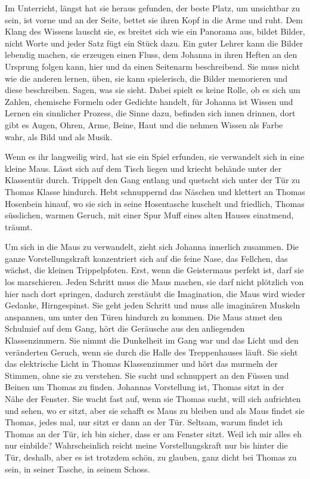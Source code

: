 \documentclass[10pt,titlepage,a5paper]{book}
\begin{document}
Im Unterricht, längst hat sie heraus gefunden, der beste Platz, um unsichtbar zu sein, ist vorne und an der Seite, bettet sie ihren Kopf in die Arme und ruht. Dem Klang des Wissens lauscht sie, es breitet sich wie ein Panorama aus, bildet Bilder, nicht Worte und jeder Satz fügt ein Stück dazu. Ein guter Lehrer kann die Bilder lebendig machen, sie erzeugen einen Fluss, dem Johanna in ihren Heften an den Ursprung folgen kann, hier und da einen Seitenarm beschreibend. Sie muss nicht wie die anderen lernen, üben, sie kann spielerisch, die Bilder memorieren und diese beschreiben. Sagen, was sie sieht. Dabei spielt es keine Rolle, ob es sich um Zahlen, chemische Formeln oder Gedichte handelt, für Johanna ist Wissen und Lernen ein sinnlicher Prozess, die Sinne dazu, befinden sich innen drinnen, dort gibt es Augen, Ohren, Arme, Beine, Haut und die nehmen Wissen als Farbe wahr, als Bild  und als Musik.

Wenn es ihr langweilig wird, hat sie ein Spiel erfunden, sie verwandelt sich in eine kleine Maus. Lässt sich auf dem Tisch liegen und kriecht behände unter der Klassentür durch. Trippelt den Gang entlang und quetscht sich unter der Tür zu Thomas Klasse hindurch. Hebt schnuppernd das Näschen und klettert an Thomas Hosenbein hinauf, wo sie sich in seine Hosentasche kuschelt und friedlich, Thomas süsslichen, warmen Geruch, mit einer Spur Muff eines alten Hauses einatmend, träumt. 

Um sich in die Maus zu verwandelt, zieht sich Johanna innerlich zusammen. Die ganze Vorstellungskraft konzentriert sich auf die feine Nase, das Fellchen, das wächst, die kleinen Trippelpfoten. Erst, wenn die Geistermaus perfekt ist, darf sie los marschieren. Jeden Schritt muss die Maus machen, sie darf nicht plötzlich von hier nach dort springen, dadurch zerstäubt die Imagination, die Maus wird wieder Gedanke, Hirngespinst. Sie geht jeden Schritt und muss alle imaginären Muskeln anspannen, um unter den Türen hindurch zu kommen. Die Maus atmet den Schulmief auf dem Gang, hört die Geräusche aus den anliegenden Klassenzimmern. Sie nimmt die Dunkelheit im Gang war und das Licht und den veränderten Geruch, wenn sie durch die Halle des Treppenhauses läuft. Sie sieht das elektrische Licht in Thomas Klassenzimmer und hört das murmeln der Stimmen, ohne sie zu verstehen. Sie sucht und schnuppert an den Füssen und Beinen um Thomas zu finden. Johannas Vorstellung ist, Thomas sitzt in der Nähe der Fenster. Sie wacht fast auf, wenn sie Thomas sucht, will sich aufrichten und sehen, wo er sitzt, aber sie schafft es Maus zu bleiben und als Maus findet sie Thomas, jedes mal, nur sitzt er dann an der Tür. Seltsam, warum findet ich Thomas an der Tür, ich bin sicher, dass er am Fenster sitzt. Weil ich mir alles eh nur einbilde? Wahrscheinlich reicht meine Vorstellungskraft nur bis hinter die Tür, deshalb, aber es ist trotzdem schön, zu glauben, ganz dicht bei Thomas zu sein, in seiner Tasche, in seinem Schoss.
\end{document}
